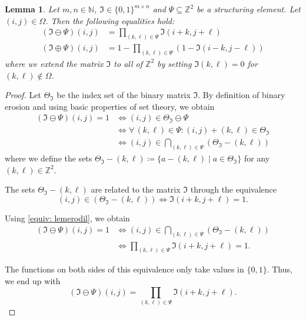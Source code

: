 \documentclass[a4paper,12pt]{article}
\theoremstyle{plain}
\newtheorem{lemma}[theorem]{Lemma}
\theoremstyle{definition}
\begin{document}
\begin{lemma}\label{lem: erodil}
	Let $m, n \in \mathbb{N}$, $\mathfrak{I} \in \{ 0, 1 \}^{m \times n}$ and $\Psi \subseteq \mathbb{Z}^2$ be a structuring element. Let $(i, j) \in \Omega$. Then the following equalities hold:
	\begin{align}
		(\mathfrak{I} \ominus \Psi)(i, j) &= \prod_{(k, \ell) \in \Psi} \mathfrak{I}(i + k, j + \ell) \label{eq: erosion} \\
		(\mathfrak{I} \oplus \Psi)(i, j) &= 1 - \prod_{(k, \ell) \in \Psi} ( 1 - \mathfrak{I}(i - k, j - \ell) ) \label{eq: dilation}
	\end{align}
	where we extend the matrix $\mathfrak{I}$ to all of $\mathbb{Z}^2$ by setting $\mathfrak{I}(k, \ell) = 0$ for $(k, \ell) \notin \Omega$.
\end{lemma}
\begin{proof}
	Let $\Theta_\mathfrak{I}$ be the index set of the binary matrix $\mathfrak{I}$. By definition of binary erosion and using basic properties of set theory, we obtain
	\begin{align*}
		(\mathfrak{I} \ominus \Psi)(i, j) = 1 &\Leftrightarrow (i, j) \in \Theta_\mathfrak{I} \ominus \Psi \\
		&\Leftrightarrow \forall \, (k, \ell) \in \Psi: (i, j) + (k, \ell) \in \Theta_\mathfrak{I} \\
		&\Leftrightarrow (i, j) \in \bigcap_{(k, \ell) \in \Psi} ( \Theta_\mathfrak{I} - (k, \ell) )
	\end{align*}
	where we define the sets $\Theta_\mathfrak{I} - (k, \ell) \coloneqq \{ a - (k, \ell) \mid a \in \Theta_\mathfrak{I} \}$ for any $(k, \ell) \in \mathbb{Z}^2$.
	
	The sets $\Theta_\mathfrak{I} - (k, \ell)$ are related to the matrix $\mathfrak{I}$ through the equivalence
	\begin{equation}\label{equiv: lemerodil}
		(i, j) \in ( \Theta_\mathfrak{I} - (k, \ell) ) \Leftrightarrow \mathfrak{I}(i + k, j + \ell) = 1.
	\end{equation}
	
	Using \eqref{equiv: lemerodil}, we obtain
	\begin{align*}
		(\mathfrak{I} \ominus \Psi)(i, j) = 1 &\Leftrightarrow (i, j) \in \bigcap_{(k, \ell) \in \Psi} ( \Theta_\mathfrak{I} - (k, \ell) ) \\
		&\Leftrightarrow \prod_{(k, \ell) \in \Psi} \mathfrak{I}(i + k, j + \ell) = 1.
	\end{align*}
	
	The functions on both sides of this equivalence only take values in $\{ 0, 1 \}$. Thus, we end up with
	\begin{equation*}
		(\mathfrak{I} \ominus \Psi)(i, j) = \prod_{(k, \ell) \in \Psi} \mathfrak{I}(i + k, j + \ell).
	\end{equation*}
	

\end{proof}
\end{document}

